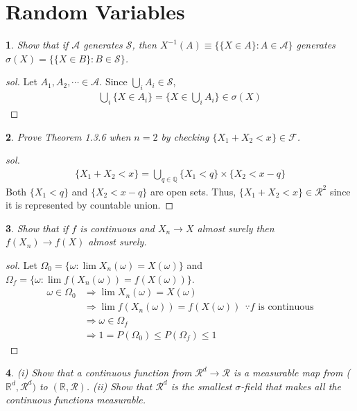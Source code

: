 \documentclass{report}
\newtheorem{ex}{}[section]
\begin{document}
\section{Random Variables}
\begin{ex}
Show that if $\mathcal{A}$ generates $\mathcal{S}$, then $X^{-1}(A) \equiv \{\{X \in A\} : A \in \mathcal{A}\}$ generates $\sigma(X) = \{\{X \in B\} : B \in \mathcal{S}\}$.
\end{ex}
\begin{proof}[sol]
Let $A_1,A_2,\dotsb \in \mathcal{A}$. Since $\bigcup_i A_i \in \mathcal{S}$,
\begin{align*}
    \bigcup_i \{X \in A_i\} = \{X \in \bigcup_i A_i\} \in \sigma(X)
\end{align*}
\end{proof}
\begin{ex}
Prove Theorem 1.3.6 when $n = 2$ by checking $\{X_1+X_2 < x\} \in \mathcal{F}$.
\end{ex}
\begin{proof}[sol]
\begin{align*}
    \{X_1+X_2 < x\} = \bigcup_{q \in \mathbb{Q}} \{X_1 < q\}\times \{X_2 < x-q\}
\end{align*}
Both $\{X_1 < q\}$ and $\{X_2 < x-q\}$ are open sets. Thus, $\{X_1+X_2 < x\} \in \mathcal{R}^2$ since it is represented by countable union.
\end{proof}
\begin{ex}
Show that if $f$ is continuous and $X_n \to X$ almost surely then $f(X_n) \to f(X)$ almost surely.
\end{ex}
\begin{proof}[sol]
Let $\Omega_0 = \{\omega : \lim X_n(\omega) = X(\omega)\}$ and $\Omega_f = \{\omega : \lim f(X_n(\omega)) = f(X(\omega))\}$.
\begin{align*}
    \omega \in \Omega_0 &\Rightarrow \lim X_n(\omega) = X(\omega)\\
    &\Rightarrow \lim f(X_n(\omega)) = f(X(\omega))  \ \ \because f\text{ is continuous}\\
    &\Rightarrow \omega \in \Omega_f\\
    &\Rightarrow 1 = P(\Omega_0) \le P(\Omega_f)\le 1
\end{align*}
\end{proof}
\begin{ex}
(i) Show that a continuous function from $\mathcal{R}^d \to \mathcal{R}$ is a measurable map from ($\mathbb{R}^d,\mathcal{R}^d)$ to $(\mathbb{R},\mathcal{R})$. (ii) Show that $\mathcal{R}^d$ is the smallest $\sigma$-field that makes all the continuous functions measurable.
\end{ex}
\end{document}
